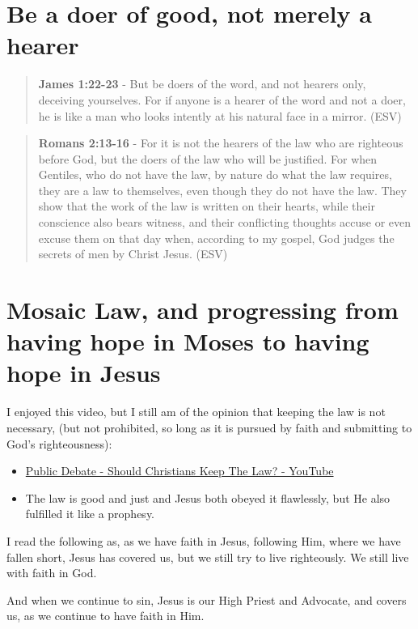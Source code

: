\documentclass[11pt]{article}
\begin{document}
\section{Be a doer of good, not merely a hearer}
\label{sec:orga864053}
\begin{quote}
\textbf{James 1:22-23} -  But be doers of the word, and not hearers only, deceiving yourselves. For if anyone is a hearer of the word and not a doer, he is like a man who looks intently at his natural face in a mirror. (ESV)
\end{quote}

\begin{quote}
\textbf{Romans 2:13-16} - For it is not the hearers of the law who are righteous before God, but the doers of the law who will be justified.  For when Gentiles, who do not have the law, by nature do what the law requires, they are a law to themselves, even though they do not have the law.  They show that the work of the law is written on their hearts, while their conscience also bears witness, and their conflicting thoughts accuse or even excuse them on that day when, according to my gospel, God judges the secrets of men by Christ Jesus. (ESV)
\end{quote}

\section{Mosaic Law, and progressing from having hope in Moses to having hope in Jesus}
\label{sec:org8305d6b}
I enjoyed this video, but I still am of the opinion that keeping the law is not necessary, (but not prohibited, so long as it is pursued by faith and submitting to God's righteousness):
\begin{itemize}
\item \href{https://www.youtube.com/watch?v=CNHKqhwu6Bo}{Public Debate - Should Christians Keep The Law? - YouTube}
\item The law is good and just and Jesus both obeyed it flawlessly, but He also fulfilled it like a prophesy.
\end{itemize}

I read the following as, as we have faith in Jesus, following Him, where we have fallen short, Jesus has covered us, but we still try to live righteously. We still live with faith in God.

And when we continue to sin, Jesus is our High Priest and Advocate, and covers us, as we continue to have faith in Him.
\end{document}
